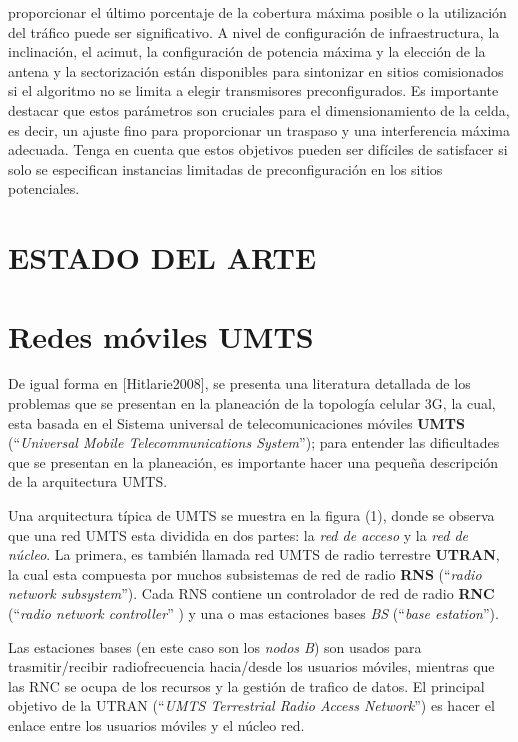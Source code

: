 \documentclass[]{article}
\begin{document}
\begin{itemize}
  proporcionar el último porcentaje de la cobertura máxima posible o la
  utilización del tráfico puede ser significativo. A nivel de
  configuración de infraestructura, la inclinación, el acimut, la
  configuración de potencia máxima y la elección de la antena y la
  sectorización están disponibles para sintonizar en sitios comisionados
  si el algoritmo no se limita a elegir transmisores preconfigurados. Es
  importante destacar que estos parámetros son cruciales para el
  dimensionamiento de la celda, es decir, un ajuste fino para
  proporcionar un traspaso y una interferencia máxima adecuada. Tenga en
  cuenta que estos objetivos pueden ser difíciles de satisfacer si solo
  se especifican instancias limitadas de preconfiguración en los sitios
  potenciales.
\end{itemize}

\section*{ESTADO DEL ARTE}\label{estado-del-arte}

\section{Redes móviles UMTS}\label{redes-muxf3viles-umts}

De igual forma en {[}Hitlarie2008{]}, se presenta una literatura
detallada de los problemas que se presentan en la planeación de la
topología celular 3G, la cual, esta basada en el Sistema universal de
telecomunicaciones móviles \textbf{UMTS} (``\emph{Universal Mobile
Telecommunications System}''); para entender las dificultades que se
presentan en la planeación, es importante hacer una pequeña descripción
de la arquitectura UMTS.

Una arquitectura típica de UMTS se muestra en la figura (1), donde se
observa que una red UMTS esta dividida en dos partes: la \emph{red de
acceso} y la \emph{red de núcleo}. La primera, es también llamada red
UMTS de radio terrestre \textbf{UTRAN}, la cual esta compuesta por
muchos subsistemas de red de radio \textbf{RNS} (``\emph{radio network
subsystem}''). Cada RNS contiene un controlador de red de radio
\textbf{RNC} (``\emph{radio network controller}'' ) y una o mas
estaciones bases \emph{BS} (``\emph{base estation}'').

Las estaciones bases (en este caso son los \emph{nodos B}) son usados
para trasmitir/recibir radiofrecuencia hacia/desde los usuarios móviles,
mientras que las RNC se ocupa de los recursos y la gestión de trafico de
datos. El principal objetivo de la UTRAN (``\emph{UMTS Terrestrial Radio
Access Network}'') es hacer el enlace entre los usuarios móviles y el
núcleo red.
\end{document}
